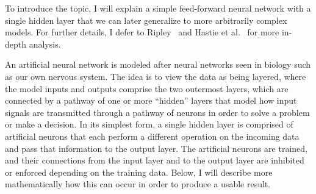 To introduce the topic, I will explain a simple feed-forward neural network with a single hidden layer that we can later generalize to more arbitrarily complex models.
%
For further details, I defer to Ripley~\cite{Ripley1996} and Hastie et al.~\cite{HastieTibshiraniFriedman2008} for more in-depth analysis.

An artificial neural network is modeled after neural networks seen in biology such as our own nervous system.
%
The idea is to view the data as being layered, where the model inputs and outputs comprise the two outermost layers, which are connected by a pathway of one or more ``hidden'' layers that model how input signals are transmitted through a pathway of neurons in order to solve a problem or make a decision.
%
In its simplest form, a single hidden layer is comprised of artificial neurons that each perform a different operation on the incoming data and pass that information to the output layer.
%
The artificial neurons are trained, and their connections from the input layer and to the output layer are inhibited or enforced depending on the training data.
%
Below, I will describe more mathematically how this can occur in order to produce a usable result.

